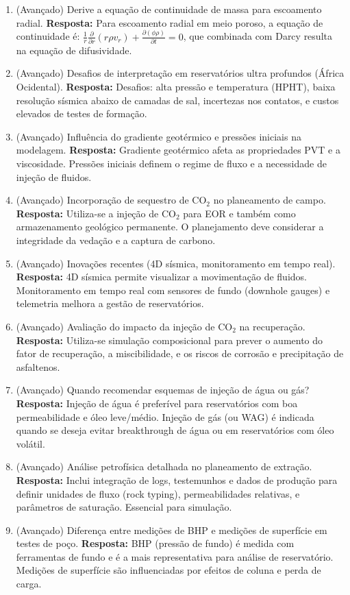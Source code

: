 \documentclass[11pt,a4paper]{article}
\begin{document}
\begin{enumerate}
  \item (Avançado) Derive a equação de continuidade de massa para escoamento radial.
  \textbf{Resposta:} Para escoamento radial em meio poroso, a equação de continuidade é: $\frac{1}{r}\frac{\partial}{\partial r}\left(r \rho v_r\right) + \frac{\partial(\phi \rho)}{\partial t} = 0$, que combinada com Darcy resulta na equação de difusividade.

  \item (Avançado) Desafios de interpretação em reservatórios ultra profundos (África Ocidental).
  \textbf{Resposta:} Desafios: alta pressão e temperatura (HPHT), baixa resolução sísmica abaixo de camadas de sal, incertezas nos contatos, e custos elevados de testes de formação.

  \item (Avançado) Influência do gradiente geotérmico e pressões iniciais na modelagem.
  \textbf{Resposta:} Gradiente geotérmico afeta as propriedades PVT e a viscosidade. Pressões iniciais definem o regime de fluxo e a necessidade de injeção de fluidos.

  \item (Avançado) Incorporação de sequestro de CO$_2$ no planeamento de campo.
  \textbf{Resposta:} Utiliza-se a injeção de CO$_2$ para EOR e também como armazenamento geológico permanente. O planejamento deve considerar a integridade da vedação e a captura de carbono.

  \item (Avançado) Inovações recentes (4D sísmica, monitoramento em tempo real).
  \textbf{Resposta:} 4D sísmica permite visualizar a movimentação de fluidos. Monitoramento em tempo real com sensores de fundo (downhole gauges) e telemetria melhora a gestão de reservatórios.

  \item (Avançado) Avaliação do impacto da injeção de CO$_2$ na recuperação.
  \textbf{Resposta:} Utiliza-se simulação composicional para prever o aumento do fator de recuperação, a miscibilidade, e os riscos de corrosão e precipitação de asfaltenos.

  \item (Avançado) Quando recomendar esquemas de injeção de água ou gás?
  \textbf{Resposta:} Injeção de água é preferível para reservatórios com boa permeabilidade e óleo leve/médio. Injeção de gás (ou WAG) é indicada quando se deseja evitar breakthrough de água ou em reservatórios com óleo volátil.

  \item (Avançado) Análise petrofísica detalhada no planeamento de extração.
  \textbf{Resposta:} Inclui integração de logs, testemunhos e dados de produção para definir unidades de fluxo (rock typing), permeabilidades relativas, e parâmetros de saturação. Essencial para simulação.

  \item (Avançado) Diferença entre medições de BHP e medições de superfície em testes de poço.
  \textbf{Resposta:} BHP (pressão de fundo) é medida com ferramentas de fundo e é a mais representativa para análise de reservatório. Medições de superfície são influenciadas por efeitos de coluna e perda de carga.
\end{enumerate}
\end{document}

